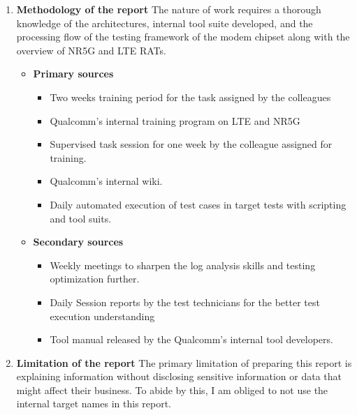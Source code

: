 \begin{enumerate}
    \item \textbf{Methodology of the report} The nature of work requires a thorough knowledge of the architectures, internal tool suite developed, and the processing flow of the testing framework of the modem chipset along with the overview of NR5G and LTE RATs.
        \begin{itemize}
            \item \textbf{Primary sources}
                   \begin{itemize}
                       \item Two weeks training period for the task assigned by the colleagues
                       \item Qualcomm's internal training program on LTE and NR5G
                       \item Supervised task session for one week by the colleague assigned for training.
                       \item Qualcomm's internal wiki.
                       \item Daily automated execution of test cases in target tests with scripting and tool suits.
                   \end{itemize}
               \item \textbf{Secondary sources} 
                    \begin{itemize}
                        \item Weekly meetings to sharpen the log analysis skills and testing optimization further.
                        \item Daily Session reports by the test technicians for the better test execution understanding
                        \item Tool manual released by the Qualcomm's internal tool developers.
                    \end{itemize}
        \end{itemize}
    \item \textbf{Limitation of the report} The primary limitation of preparing this report is explaining information without disclosing sensitive information or data that might affect their business. 
    To abide by this, I am obliged to not use the internal target names in this report.
\end{enumerate}